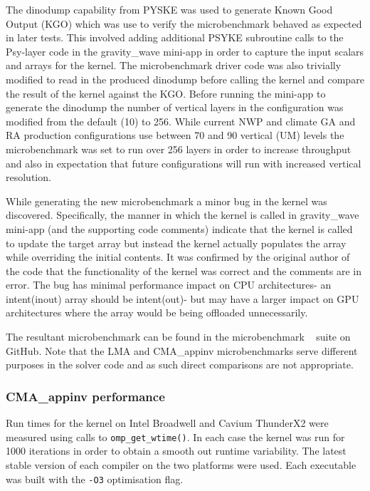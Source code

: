 The dinodump capability from PYSKE was used to generate Known Good Output (KGO) which was use to verify the microbenchmark behaved as expected in later tests.
This involved adding additional PSYKE subroutine calls to the Psy-layer code in the gravity\_wave mini-app in order to capture the input scalars and arrays for the kernel.
The microbenchmark driver code was also trivially modified to read in the produced dinodump before calling the kernel and compare the result of the kernel against the KGO.
Before running the mini-app to generate the dinodump the number of vertical layers in the configuration was modified from the default (10) to 256.
While current NWP and climate GA and RA production configurations use between 70 and 90 vertical (UM) levels the microbenchmark was set to run over 256 layers in order to increase throughput and also in expectation that future configurations will run with increased vertical resolution.

While generating the new microbenchmark a minor bug in the kernel was discovered.
Specifically, the manner in which the kernel is called in gravity\_wave mini-app (and the supporting code comments) indicate that the kernel is called to update the target array but instead the kernel actually populates the array while overriding the initial contents.
It was confirmed by the original author of the code that the functionality of the kernel was correct and the comments are in error.
The bug has minimal performance impact on CPU architectures- an intent(inout) array should be intent(out)- but may have a larger impact on GPU architectures where the array would be being offloaded unnecessarily. 

The resultant microbenchmark can be found in the microbenchmark ~\cite{lfric-microbenchmarks} suite on GitHub.
Note that the LMA and CMA\_appinv microbenchmarks serve different purposes in the solver code and as such direct comparisons are not appropriate.

\subsubsection{CMA\_appinv performance}

Run times for the kernel on Intel Broadwell and Cavium ThunderX2 were measured using calls to \verb+omp_get_wtime()+.
In each case the kernel was run for 1000 iterations in order to obtain a smooth out runtime variability.
The latest stable version of each compiler on the two platforms were used.
Each executable was built with the \verb+-O3+ optimisation flag.

